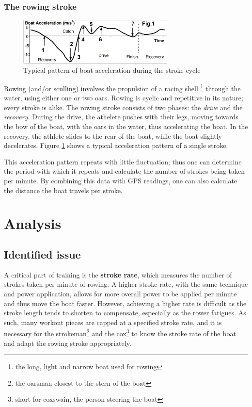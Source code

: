 \documentclass[11pt,twoside,a4paper]{report}
\begin{document}
\subsection{The rowing stroke}

\begin{figure}[ht]
    \centering
    \includegraphics[width=0.7\textwidth]{rowing-stroke}
    \caption{Typical pattern of boat acceleration during the stroke cycle \cite{dr_valery_kleshnev_analysis_2012}}
    \label{fig:rowing-stroke}
\end{figure}

Rowing (and/or sculling) involves the propulsion of a racing shell \footnote{the long, light and narrow boat used for rowing} through the water, using either one or two oars. 
Rowing is cyclic and repetitive in its nature; every stroke is alike. 
The rowing stroke consists of two phases: the \textit{drive} and the \textit{recovery}. 
During the drive, the athelete pushes with their legs, moving towards the bow of the boat, with the oars in the water, thus accelerating the boat.
In the recovery, the athlete slides to the rear of the boat, while the boat slightly decelerates.
Figure \ref{fig:rowing-stroke} shows a typical acceleration pattern of a single stroke.

This acceleration pattern repeats with little fluctuation; thus one can determine the period with which it repeats and calculate the number of strokes being taken per minute. By combining this data with GPS readings, one can also calculate the distance the boat travels per stroke.

\chapter{Analysis}

\section{Identified issue}

A critical part of training is the \textbf{stroke rate}, which measures the number of strokes taken per minute of rowing. A higher stroke rate, with the same technique and power application, allows for more overall power to be applied per minute and thus move the boat faster. However, achieving a higher rate is difficult as the stroke length tends to shorten to compensate, especially as the rower fatigues. As such, many workout pieces are capped at a specified stroke rate, and it is necessary for the strokeman\footnote{the oarsman closest to the stern of the boat} and the cox\footnote{short for coxswain, the person steering the boat} to know the stroke rate of the boat and adapt the rowing stroke appropriately.
\end{document}
